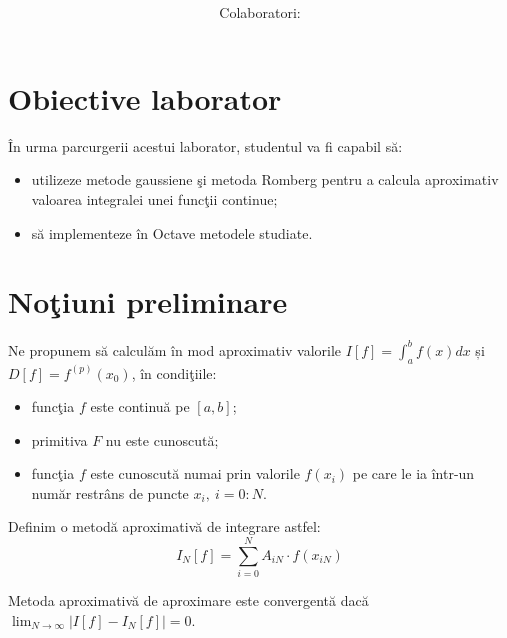 \documentclass{exam}
\title{
	\textmd{\textbf{\MNLabTitle}}
	\author{Colaboratori: \MNAuthor}
}
\begin{document}
\begin{coverpages}

	\maketitle
	\tableofcontents

\end{coverpages}

\section{Obiective laborator}

În urma parcurgerii acestui laborator, studentul va fi capabil să:
\begin{itemize}
	\item
	      utilizeze metode gaussiene \c{s}i metoda Romberg pentru a calcula aproximativ valoarea integralei unei func\c{t}ii continue;
	\item
	      s\u{a} implementeze \^{i}n Octave metodele studiate.
\end{itemize}


\section{No\c{t}iuni preliminare}

Ne propunem s\u{a} calcul\u{a}m \^{i}n mod aproximativ valorile $ I\left[f\right] = \int_a^b f\left(x\right) dx $ și $ D\left[f\right] = f^{\left(p\right)} (x_0) $, \^{i}n condi\c{t}iile:

\begin{itemize}

	\item func\c{t}ia $ f $ este continu\u{a} pe $ [a, b] $;
	\item primitiva $ F $ nu este cunoscut\u{a};
	\item func\c{t}ia $ f $ este cunoscut\u{a} numai prin valorile $ f\left(x_i\right) $ pe care le ia \^{i}ntr-un num\u{a}r restr\^{a}ns de puncte $ x_i, \ i = 0 : N $.

\end{itemize}

Definim o metod\u{a} aproximativ\u{a} de integrare astfel:
$$ I_N\left[f\right] = \sum_{i = 0}^N A_{iN} \cdot f\left(x_{iN}\right) $$

Metoda aproximativ\u{a} de aproximare este convergent\u{a} dac\u{a} $ \lim_{N \rightarrow \infty} \left| I\left[f\right] - I_N \left[f\right] \right| = 0 $.
\end{document}
